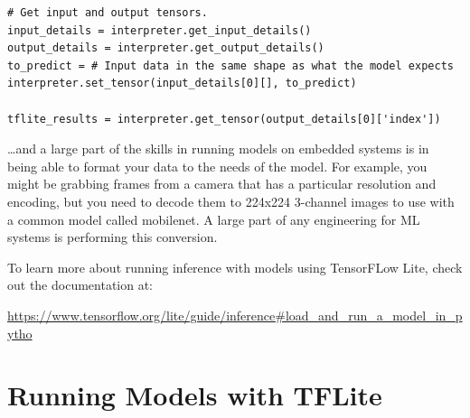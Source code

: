 \begin{lstlisting}
# Get input and output tensors.
input_details = interpreter.get_input_details()
output_details = interpreter.get_output_details()
to_predict = # Input data in the same shape as what the model expects
interpreter.set_tensor(input_details[0][], to_predict)

tflite_results = interpreter.get_tensor(output_details[0]['index'])
\end{lstlisting}

\ldots and a large part of the skills in running models on embedded systems is in being able to format your data to the needs of the model. For example, you might be grabbing frames from a camera that has a particular resolution and encoding, but you need to decode them to 224x224 3-channel images to use with a common model called mobilenet. A large part of any engineering for ML systems is performing this conversion. 

To learn more about running inference with models using TensorFLow Lite, check out the documentation at: 

\url{https://www.tensorflow.org/lite/guide/inference#load_and_run_a_model_in_pytho}

\section{Running Models with TFLite}

